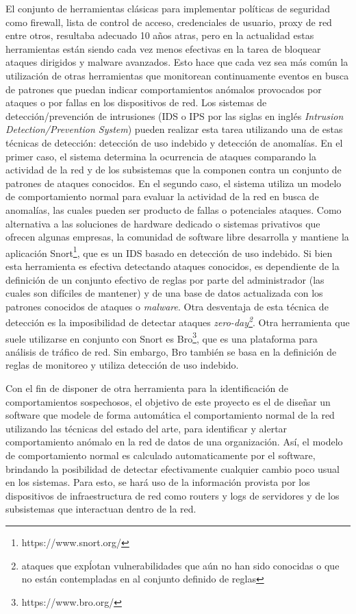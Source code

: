 El conjunto de herramientas clásicas para implementar políticas de seguridad como firewall, lista de control de acceso, credenciales de usuario, proxy de red entre otros, resultaba adecuado 10 años atras, pero en la actualidad estas herramientas están siendo cada vez menos efectivas en la tarea de bloquear ataques dirigidos y malware avanzados. Esto hace que cada vez sea más común la utilización de otras herramientas que monitorean continuamente eventos en busca de patrones que puedan indicar comportamientos anómalos provocados por ataques o por fallas en los dispositivos de red. Los sistemas de detección/prevención de intrusiones (IDS o IPS por las siglas en inglés \textit{Intrusion Detection/Prevention System}) pueden realizar esta tarea utilizando una de estas técnicas de detección: detección de uso indebido y detección de anomalías\cite{Milenkoski:2015:ECI:2808687.2808691}. En el primer caso, el sistema determina la ocurrencia de ataques comparando la actividad de la red y de los subsistemas que la componen contra un conjunto de patrones de ataques conocidos. En el segundo caso, el sistema utiliza un modelo de comportamiento normal para evaluar la actividad de la red en busca de anomalías, las cuales pueden ser producto de fallas o potenciales ataques. Como alternativa a las soluciones de hardware dedicado o sistemas privativos que ofrecen algunas empresas, la comunidad de software libre desarrolla y mantiene la aplicación Snort\footnote{https://www.snort.org/}, que es un IDS basado en detección de uso indebido. Si bien esta herramienta es efectiva detectando ataques conocidos, es dependiente de la definición de un conjunto efectivo de reglas por parte del administrador (las cuales son difíciles de mantener) y de una base de datos actualizada con los patrones conocidos de ataques o \textit{malware}. Otra desventaja de esta técnica de detección es la imposibilidad de detectar ataques \textit{zero-day\footnote{ataques que expĺotan vulnerabilidades que aún no han sido conocidas o que no están contempladas en al conjunto definido de reglas}}\cite{Milenkoski:2015:ECI:2808687.2808691}. Otra herramienta que suele utilizarse en conjunto con Snort es Bro\footnote{https://www.bro.org/}, que es una plataforma para análisis de tráfico de red. Sin embargo, Bro también se basa en la definición de reglas de monitoreo y utiliza detección de uso indebido. \par

Con el fin de disponer de otra herramienta para la identificación de comportamientos sospechosos, el objetivo de este proyecto es el de diseñar un software que modele de forma automática el comportamiento normal de la red utilizando las técnicas del estado del arte, para identificar y alertar comportamiento anómalo en la red de datos de una organización. Así, el modelo de comportamiento normal es calculado automaticamente por el software, brindando la posibilidad de detectar efectivamente cualquier cambio poco usual en los sistemas. Para esto, se hará uso de la información provista por los dispositivos de infraestructura de red como routers y logs de servidores y de los subsistemas que interactuan dentro de la red.
\newpage

